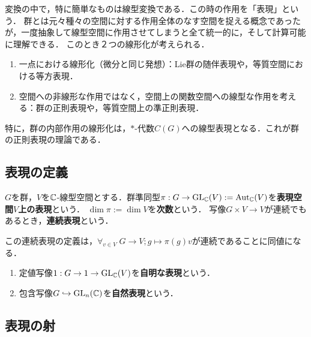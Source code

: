 \documentclass[uplatex,dvipdfmx]{jsreport}
\begin{document}
\begin{tcolorbox}[colframe=ForestGreen, colback=ForestGreen!10!white,breakable,colbacktitle=ForestGreen!40!white,coltitle=black,fonttitle=\bfseries\sffamily,
title=]
    変換の中で，特に簡単なものは線型変換である．この時の作用を「表現」という．
    群とは元々種々の空間に対する作用全体のなす空間を捉える概念であったが，一度抽象して線型空間に作用させてしまうと全て統一的に，そして計算可能に理解できる．
    このとき２つの線形化が考えられる．
    \begin{enumerate}
        \item 一点における線形化（微分と同じ発想）：Lie群の随伴表現や，等質空間における等方表現．
        \item 空間への非線形な作用ではなく，空間上の関数空間への線型な作用を考える：群の正則表現や，等質空間上の準正則表現．
    \end{enumerate}
    特に，群の内部作用の線形化は，$*$-代数$C(G)$への線型表現となる．これが群の正則表現の理論である．
\end{tcolorbox}

\subsection{表現の定義}

\begin{definition}[representation]
    $G$を群，$V$を$\mathbb{C}$-線型空間とする．群準同型$\pi:G\to\mathrm{GL}_{\mathbb{C}}(V):=\mathrm{Aut}_{\mathbb{C}}(V)$を\textbf{表現空間$V$上の表現}という．
    $\dim\pi:=\dim V$を\textbf{次数}という．
    写像$G\times V\to V$が連続でもあるとき，\textbf{連続表現}という．
\end{definition}
\begin{remarks}
    この連続表現の定義は，$\forall_{v\in V}\;G\to V;g\mapsto \pi(g)v$が連続であることに同値になる．
\end{remarks}

\begin{example}\mbox{}
    \begin{enumerate}
        \item 定値写像$1:G\to1\to\mathrm{GL}_{\mathbb{C}}(V)$を\textbf{自明な表現}という．
        \item 包含写像$G\hookrightarrow\mathrm{GL}_n(\mathbb{C})$を\textbf{自然表現}という．
    \end{enumerate}
\end{example}

\subsection{表現の射}
\end{document}
